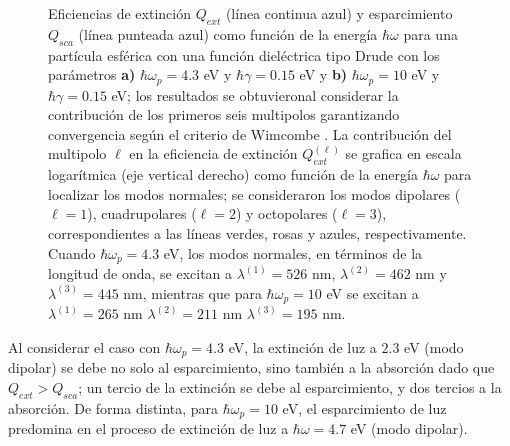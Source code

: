 \begin{figure}[h!]
\begin{subfigure}{.45\linewidth}
	\end{subfigure}\vspace*{-.7em}
	\caption{Eficiencias de extinción $Q_{ext}$ (línea continua azul) y esparcimiento $Q_{sca}$ (línea punteada azul) como función de la energía $\hbar\omega$ para una partícula esférica con una función dieléctrica tipo Drude con los parámetros \textbf{a)} $\hbar\omega_p=4.3$ eV y $\hbar\gamma = 0.15$ eV y \textbf{b)} $\hbar\omega_p=10$ eV y $\hbar\gamma = 0.15$ eV; los resultados se obtuvieronal considerar la contribución de los primeros seis multipolos garantizando convergencia según el criterio de Wimcombe \cite{wimcombre}. La contribución del multipolo $\ell$ en la eficiencia de extinción $Q_{ext}^{(\ell)}$ se grafica en escala logarítmica (eje vertical derecho) como función de la energía $\hbar\omega$ para localizar los modos normales; se consideraron los modos dipolares ($\ell =1$), cuadrupolares ($\ell = 2$) y octopolares ($\ell = 3$), correspondientes a las líneas verdes, rosas y azules, respectivamente.  Cuando $\hbar\omega_p = 4.3$ eV, los modos normales, en términos de la longitud de onda, se excitan a $\lambda^{(1)}= 526$ nm, $\lambda^{(2)}= 462$ nm y $\lambda^{(3)}= 445 $ nm, mientras que para $\hbar\omega_p = 10$ eV se excitan a $\lambda^{(1)}= 265$ nm $\lambda^{(2)}= 211$ nm $\lambda^{(3)}= 195$ nm.}
	\label{fig:QextDrude}
	\end{figure}	

Al considerar el caso con $\hbar\omega_p = 4.3$ eV, la extinción de luz a $2.3$ eV (modo dipolar) se debe no solo al esparcimiento, sino también a la absorción dado que $Q_{ext}>Q_{sca}$; un tercio de la extinción se debe al esparcimiento, y dos tercios a la absorción. De forma distinta, para $\hbar\omega_p = 10$ eV, el esparcimiento de luz predomina en el proceso de extinción de luz a $\hbar\omega= 4.7$ eV (modo dipolar).












